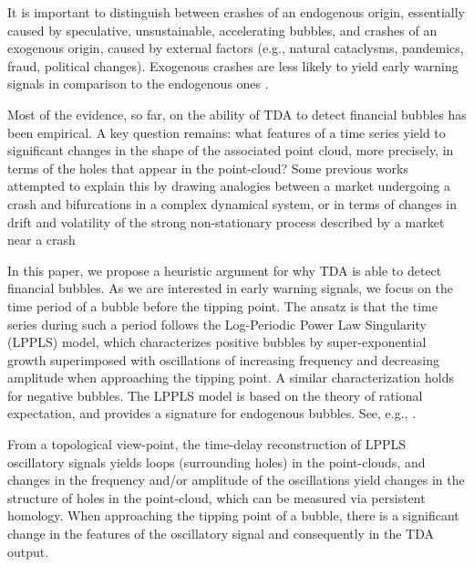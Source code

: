 \documentclass[11pt]{amsart}
\theoremstyle{definition}
\theoremstyle{remark}
\numberwithin{equation}{section}
\begin{document}
It is important to distinguish between crashes of an endogenous origin, essentially caused by speculative, unsustainable, accelerating bubbles, and crashes of an exogenous  origin, caused by external factors (e.g., natural cataclysms, pandemics, fraud,
political changes).  Exogenous crashes are less likely to yield early warning signals in comparison to the endogenous ones \cite{song20222020,shu2021covid}.


Most of the evidence, so far, on the ability of TDA to detect financial bubbles has been empirical. A key question remains: what features of a time series yield to significant changes in the shape of the associated point cloud,  more precisely, in terms of the holes that appear in the point-cloud?
Some previous works attempted to explain this by drawing analogies between a market  undergoing a crash
and   bifurcations in a complex dynamical system, or in terms of changes in drift and volatility of the strong non-stationary process
described by a market near a crash
\cite{gidea2017topological,gidea2018topological,gidea2020topological,aromi2021topological,katz2022topological}

In this paper, we propose a heuristic argument  for why TDA is able to detect financial bubbles.
As we are interested in early warning signals, we focus on the time period of a bubble before the tipping point.
The ansatz is that  the   time series during such a period follows the  Log-Periodic Power Law Singularity  (LPPLS) model, which characterizes positive bubbles by super-exponential growth superimposed with oscillations of increasing frequency and decreasing amplitude when approaching the tipping point. A similar characterization holds for negative bubbles. The LPPLS model is based on the theory of rational expectation, and provides a signature for endogenous bubbles. See, e.g., \cite{blanchard1979speculative,blanchard1982bubbles,feigenbaum1996discrete,johansen1996discrete,
johansen2000crashes,yan2012detection,lin2013diagnostics,seyrich2016micro,sornette2017stock,gerlach2018dissection}.


From a topological view-point,  the time-delay reconstruction of LPPLS oscillatory signals  yields loops (surrounding  holes) in the point-clouds, and changes in the frequency and/or amplitude of the oscillations yield changes in the structure of  holes in the point-cloud, which can be measured via persistent homology.
When approaching the tipping point of a bubble, there is a significant change in the features of the oscillatory signal and consequently in the TDA output.
\end{document}
